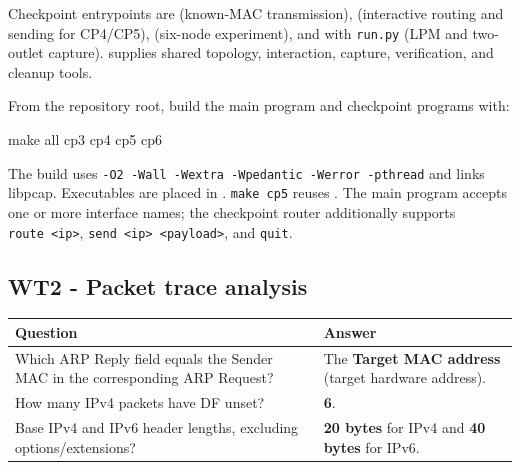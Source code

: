 \documentclass[
  a4paper,
  10pt]{article}
\newenvironment{Shaded}{}{}
\newcommand{\NormalTok}[1]{#1}
\newcounter{none} %
\begin{document}
Checkpoint entrypoints are
{\ttfamily{}} (known-MAC
transmission), {\ttfamily{}} (interactive
routing and sending for CP4/CP5), {\ttfamily{}}
(six-node experiment), and {\ttfamily{}} with
\texttt{run.py} (LPM and two-outlet capture).
{\ttfamily{}} supplies shared
topology, interaction, capture, verification, and cleanup tools.

From the repository root, build the main program and checkpoint programs
with:

\begin{Shaded}
\begin{Highlighting}[]
\NormalTok{make all cp3 cp4 cp5 cp6}
\end{Highlighting}
\end{Shaded}

The build uses
\texttt{-O2\ -Wall\ -Wextra\ -Wpedantic\ -Werror\ -pthread} and links
libpcap. Executables are placed in {\ttfamily{}}.
\texttt{make\ cp5} reuses {\ttfamily{}}. The main
program accepts one or more interface names; the checkpoint router
additionally supports \texttt{route\ \textless{}ip\textgreater{}},
\texttt{send\ \textless{}ip\textgreater{}\ \textless{}payload\textgreater{}},
and \texttt{quit}.

\subsection{WT2 - Packet trace
analysis}\label{wt2---packet-trace-analysis}

{\def\LTcaptype{none} %
\begin{longtable}[]{@{}
  >{\raggedright\arraybackslash}p{}
  >{\raggedright\arraybackslash}p{}@{}}
\toprule\noalign{}
\begin{minipage}[b]{\linewidth}\raggedright
Question
\end{minipage} & \begin{minipage}[b]{\linewidth}\raggedright
Answer
\end{minipage} \\
\midrule\noalign{}
\endhead
\bottomrule\noalign{}
\endlastfoot
Which ARP Reply field equals the Sender MAC in the corresponding ARP
Request? & The \textbf{Target MAC address} (target hardware address). \\
How many IPv4 packets have DF unset? & \textbf{6}. \\
Base IPv4 and IPv6 header lengths, excluding options/extensions? &
\textbf{20 bytes} for IPv4 and \textbf{40 bytes} for IPv6. \\
\end{longtable}
}
\end{document}
